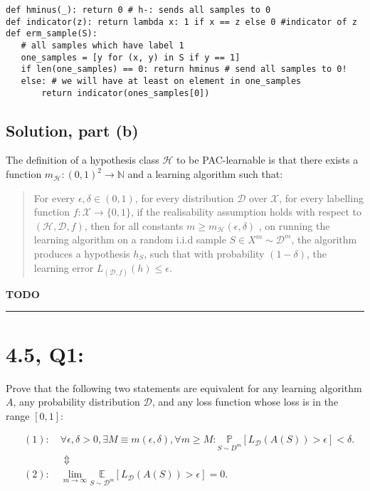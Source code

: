\documentclass[11pt]{article}
\newcommand{\D}{\ensuremath{\mathcal{D}}}
\renewcommand{\H}{\ensuremath{\mathcal{H}}}
\newcommand{\X}{\ensuremath{\mathcal{X}}}
\begin{document}
\begin{verbatim}
def hminus(_): return 0 # h-: sends all samples to 0
def indicator(z): return lambda x: 1 if x == z else 0 #indicator of z
def erm_sample(S):
   # all samples which have label 1
   one_samples = [y for (x, y) in S if y == 1]
   if len(one_samples) == 0: return hminus # send all samples to 0!
   else: # we will have at least on element in one_samples
       return indicator(ones_samples[0])
\end{verbatim}


\subsection*{Solution, part (b)}

The definition of a hypothesis class $\H$ to be PAC-learnable is that there exists
a function $m_\H: (0, 1)^2 \rightarrow \mathbb N$ and a learning algorithm
such that:

\begin{quote}
For every $\epsilon, \delta \in (0, 1)$, for every distribution $\D$ over $\X$,
for every labelling function $f: \X \rightarrow \{0, 1\}$, if the realisability
assumption holds with respect to $(\H, \D, f)$, then for all constants
$m \geq m_\H(\epsilon, \delta)$ , on running the learning algorithm on
a random i.i.d sample $S \in X^m \sim \D^m$, the algorithm produces a hypothesis
$h_S$, such that with probability $(1 - \delta)$, the learning error 
$L_{(\D, f)}(h) \leq \epsilon$.
\end{quote}

\textbf{TODO}


\rule{\textwidth}{1pt}

\section*{4.5, Q1:}
Prove that the following two statements are equivalent for any learning
algorithm $A$, any probability distribution $\D$, and any loss function
whose loss is in the range $[0, 1]$:

\begin{align*}
    &(1): \quad \forall \epsilon, \delta > 0, \exists M \equiv m(\epsilon, \delta), \forall m \geq M :
    \underset{S \sim D^m }{\mathbb P}[L_\D(A(S)) > \epsilon] < \delta. \\
    & \qquad \qquad \Updownarrow \\
    &(2): \quad \lim_{m \rightarrow \infty} \underset{S \sim \D^m }{\mathbb E}[L_\D(A(S)) > \epsilon] = 0. \\
\end{align*}
\end{document}
